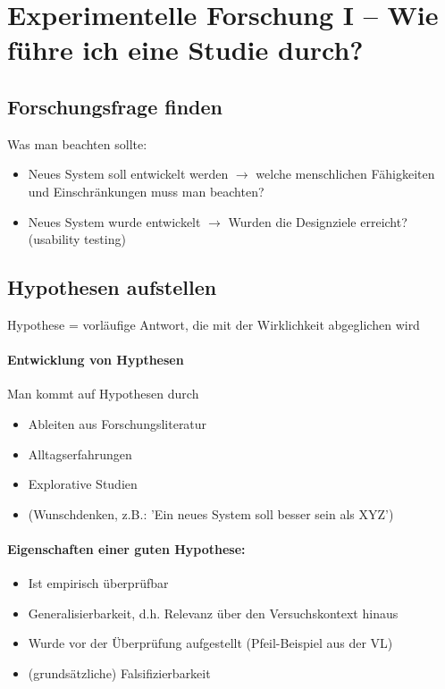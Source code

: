 \section{Experimentelle Forschung I -- Wie führe ich eine Studie durch?}
		\subsection{Forschungsfrage finden}
			Was man beachten sollte:
			\begin{itemize}
				\item Neues System soll entwickelt werden $ \longrightarrow $ welche menschlichen Fähigkeiten und Einschränkungen muss man beachten?
				\item Neues System wurde entwickelt $ \longrightarrow $ Wurden die Designziele erreicht? (usability testing)
			\end{itemize}
		
		\subsection{Hypothesen aufstellen}
			Hypothese = vorläufige Antwort, die mit der Wirklichkeit abgeglichen wird
			
			\paragraph{Entwicklung von Hypthesen}Man kommt auf Hypothesen durch
				\begin{itemize}
					\item Ableiten aus Forschungsliteratur
					\item Alltagserfahrungen
					\item Explorative Studien
					\item (Wunschdenken, z.B.: 'Ein neues System soll besser sein als XYZ')
				\end{itemize}
			
			\paragraph{Eigenschaften einer guten Hypothese:}
				\begin{itemize}
					\item Ist empirisch überprüfbar
					\item Generalisierbarkeit, d.h. Relevanz über den Versuchskontext hinaus
					\item Wurde vor der Überprüfung aufgestellt (Pfeil-Beispiel aus der VL)
					\item (grundsätzliche) Falsifizierbarkeit\Biglb
				\end{itemize}
			
